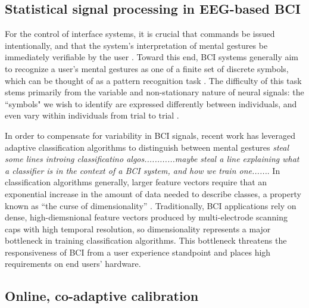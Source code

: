 \subsection{Statistical signal processing in EEG-based BCI}

\noindent For the control of interface systems, it is crucial that commands be issued intentionally, and that the system's interpretation of mental gestures be immediately verifiable by the user  \cite{millan_combining_2010,ali_empirical_2014}. Toward this end, BCI systems generally aim to recognize a user's mental gestures as one of a finite set of discrete symbols, which can be thought of as a pattern recognition task \cite{lotte_review_2007}. The difficulty of this task stems primarily from the variable and non-stationary nature of neural signals: the ``symbols" we wish to identify are expressed differently between individuals, and even vary within individuals from trial to trial \cite{vidaurre_fully_2006,vidaurre_machine-learning-based_2011}. 

In order to compensate for variability in BCI signals, recent work has leveraged adaptive classification algorithms to distinguish between mental gestures \cite{lotte_review_2007,vidaurre_machine-learning-based_2011} \textit{steal some lines introing classificatino algos............maybe steal a line explaining what a classifier is in the context of a BCI system, and how we train one......}.  In classification algorithms generally, larger feature vectors require that an exponential increase in the amount of data needed to describe classes, a property known as ``the curse of dimensionality'' \cite{jain_statistical_2000,raudys_small_1991}. Traditionally, BCI applications rely on dense, high-diemsnional feature vectors produced by multi-electrode scanning caps with high temporal resolution, so dimensionality represents a major bottleneck in training classification algorithms. This bottleneck threatens the responsiveness of BCI from a user experience standpoint and places high requirements on end users' hardware.

\subsection{Online, co-adaptive calibration}

